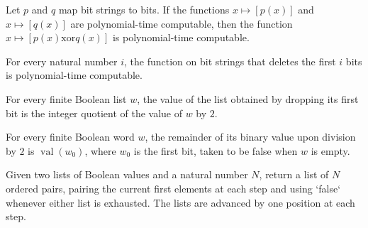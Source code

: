 \begin{theorem}
\label{Complexity.BinArith.polyTimeComputable_xor}
\leanok
{}
Let $p$ and $q$ map bit strings to bits. If the functions $x\mapsto[p(x)]$ and
$x\mapsto[q(x)]$ are polynomial-time computable, then the function
$x\mapsto[p(x)\mathbin{\mathrm{xor}}q(x)]$ is polynomial-time computable.
\end{theorem}

\begin{theorem}
\label{Complexity.BinArith.polyTimeComputable_drop}
\leanok
{}
For every natural number $i$, the function on bit strings that deletes the first $i$
bits is polynomial-time computable.
\end{theorem}

\begin{theorem}
\label{Complexity.BinArith.bitsVal_drop_one}
\leanok
{}
For every finite Boolean list $w$, the value of the list obtained by dropping its first
bit is the integer quotient of the value of $w$ by $2$.
\end{theorem}

\begin{theorem}
\label{Complexity.BinArith.bitsVal_mod_two}
\leanok
{}
For every finite Boolean word $w$, the remainder of its binary value upon division by
$2$ is $\operatorname{val}(w_0)$, where $w_0$ is the first bit, taken to be false when
$w$ is empty.
\end{theorem}

\begin{definition}
\label{Complexity.BinArith.padZip}
\leanok
Given two lists of Boolean values and a natural number $N$, return a list of $N$ ordered
pairs, pairing the current first elements at each step and using `false` whenever either
list is exhausted. The lists are advanced by one position at each step.
\end{definition}


